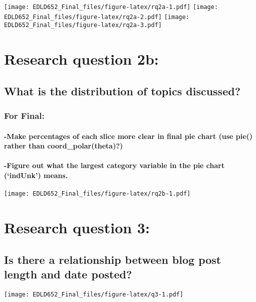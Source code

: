 \documentclass[
]{article}
\begin{document}
\texttt{[image: EDLD652\_Final\_files/figure-latex/rq2a-1.pdf]}
\texttt{[image: EDLD652\_Final\_files/figure-latex/rq2a-2.pdf]}
\texttt{[image: EDLD652\_Final\_files/figure-latex/rq2a-3.pdf]}

\hypertarget{research-question-2b}{%
\section{Research question 2b:}\label{research-question-2b}}

\hypertarget{what-is-the-distribution-of-topics-discussed}{%
\subsection{What is the distribution of topics
discussed?}\label{what-is-the-distribution-of-topics-discussed}}

\hypertarget{for-final-1}{%
\subsubsection{For Final:}\label{for-final-1}}

\hypertarget{make-percentages-of-each-slice-more-clear-in-final-pie-chart-use-pie-rather-than-coord_polartheta}{%
\paragraph{-Make percentages of each slice more clear in final pie chart
(use pie() rather than
coord\_polar(theta)?)}\label{make-percentages-of-each-slice-more-clear-in-final-pie-chart-use-pie-rather-than-coord_polartheta}}

\hypertarget{figure-out-what-the-largest-category-variable-in-the-pie-chart-indunk-means.}{%
\paragraph{-Figure out what the largest category variable in the pie
chart (`indUnk')
means.}\label{figure-out-what-the-largest-category-variable-in-the-pie-chart-indunk-means.}}

\texttt{[image: EDLD652\_Final\_files/figure-latex/rq2b-1.pdf]}

\hypertarget{research-question-3}{%
\section{Research question 3:}\label{research-question-3}}

\hypertarget{is-there-a-relationship-between-blog-post-length-and-date-posted}{%
\subsection{Is there a relationship between blog post length and date
posted?}\label{is-there-a-relationship-between-blog-post-length-and-date-posted}}

\texttt{[image: EDLD652\_Final\_files/figure-latex/q3-1.pdf]}
\end{document}
